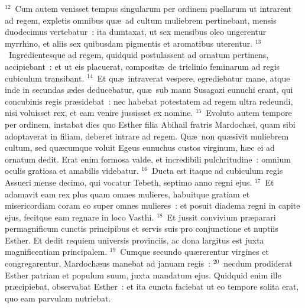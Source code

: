 ${}^{12}$~Cum autem venisset tempus singularum per ordinem puellarum ut intrarent ad regem, expletis omnibus qu\ae\ ad cultum muliebrem pertinebant, mensis duodecimus vertebatur~: ita dumtaxat, ut sex mensibus oleo ungerentur myrrhino, et aliis sex quibusdam pigmentis et aromatibus uterentur.
${}^{13}$~Ingredientesque ad regem, quidquid postulassent ad ornatum pertinens, accipiebant~: et ut eis placuerat, composit\ae\ de triclinio feminarum ad regis cubiculum transibant.
${}^{14}$~Et qu\ae\ intraverat vespere, egrediebatur mane, atque inde in secundas \ae des deducebatur, qu\ae\ sub manu Susagazi eunuchi erant, qui concubinis regis pr\ae sidebat~: nec habebat potestatem ad regem ultra redeundi, nisi voluisset rex, et eam venire jussisset ex nomine.
${}^{15}$~Evoluto autem tempore per ordinem, instabat dies quo Esther filia Abihail fratris Mardoch\ae i, quam sibi adoptaverat in filiam, deberet intrare ad regem. Qu\ae\ non qu\ae sivit muliebrem cultum, sed qu\ae cumque voluit Egeus eunuchus custos virginum, h\ae c ei ad ornatum dedit. Erat enim formosa valde, et incredibili pulchritudine~: omnium oculis gratiosa et amabilis videbatur.
${}^{16}$~Ducta est itaque ad cubiculum regis Assueri mense decimo, qui vocatur Tebeth, septimo anno regni ejus.
${}^{17}$~Et adamavit eam rex plus quam omnes mulieres, habuitque gratiam et misericordiam coram eo super omnes mulieres~: et posuit diadema regni in capite ejus, fecitque eam regnare in loco Vasthi.
${}^{18}$~Et jussit convivium pr\ae parari permagnificum cunctis principibus et servis suis pro conjunctione et nuptiis Esther. Et dedit requiem universis provinciis, ac dona largitus est juxta magnificentiam principalem.
${}^{19}$~Cumque secundo qu\ae rerentur virgines et congregarentur, Mardoch\ae us manebat ad januam regis~:
${}^{20}$~necdum prodiderat Esther patriam et populum suum, juxta mandatum ejus. Quidquid enim ille pr\ae cipiebat, observabat Esther~: et ita cuncta faciebat ut eo tempore solita erat, quo eam parvulam nutriebat.



